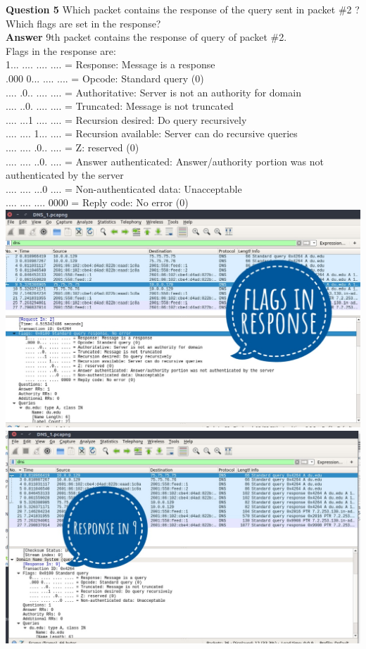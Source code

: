 \documentclass[14pt]{extarticle}
\begin{document}
    \noindent
    \textbf{\large Question 5}
    Which packet contains the response of the query sent in packet \#2 ?  Which flags are set in the response?\\[10pt]
    \textbf{\large Answer}
    9th packet contains the response of query of packet \#2.\\
    Flags in the response are:\\
    1... .... .... .... = Response: Message is a response\\
    .000 0... .... .... = Opcode: Standard query (0)\\
    .... .0.. .... .... = Authoritative: Server is not an authority for domain\\
    .... ..0. .... .... = Truncated: Message is not truncated\\
    .... ...1 .... .... = Recursion desired: Do query recursively\\
    .... .... 1... .... = Recursion available: Server can do recursive queries\\
    .... .... .0.. .... = Z: reserved (0)\\
    .... .... ..0. .... = Answer authenticated: Answer/authority portion was not authenticated by the server\\
    .... .... ...0 .... = Non-authenticated data: Unacceptable\\
    .... .... .... 0000 = Reply code: No error (0)\\[10pt]
    \includegraphics[scale=0.45]{1_5_1}\\[10pt]
    \includegraphics[scale=0.45]{1_5_2}
    \vspace{1cm}
\end{document}
